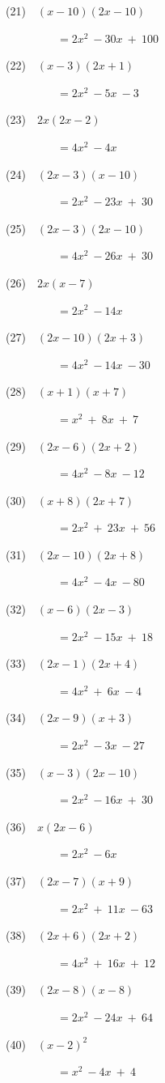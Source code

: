 \documentclass[a4j,twocolumn,10pt,fleqn]{jarticle}
\begin{document}
(21)~~$(x-10)(2x-10)$

~~~~~~~~~$=2x^2~-30x~+~100$

(22)~~$(x-3)(2x+1)$

~~~~~~~~~$=2x^2~-5x~-3$

(23)~~$2x(2x-2)$

~~~~~~~~~$=4x^2~-4x$

(24)~~$(2x-3)(x-10)$

~~~~~~~~~$=2x^2~-23x~+~30$

(25)~~$(2x-3)(2x-10)$

~~~~~~~~~$=4x^2~-26x~+~30$

(26)~~$2x(x-7)$

~~~~~~~~~$=2x^2~-14x$

(27)~~$(2x-10)(2x+3)$

~~~~~~~~~$=4x^2~-14x~-30$

(28)~~$(x+1)(x+7)$

~~~~~~~~~$=x^2~+~8x~+~7$

(29)~~$(2x-6)(2x+2)$

~~~~~~~~~$=4x^2~-8x~-12$

(30)~~$(x+8)(2x+7)$

~~~~~~~~~$=2x^2~+~23x~+~56$

(31)~~$(2x-10)(2x+8)$

~~~~~~~~~$=4x^2~-4x~-80$

(32)~~$(x-6)(2x-3)$

~~~~~~~~~$=2x^2~-15x~+~18$

(33)~~$(2x-1)(2x+4)$

~~~~~~~~~$=4x^2~+~6x~-4$

(34)~~$(2x-9)(x+3)$

~~~~~~~~~$=2x^2~-3x~-27$

(35)~~$(x-3)(2x-10)$

~~~~~~~~~$=2x^2~-16x~+~30$

(36)~~$x(2x-6)$

~~~~~~~~~$=2x^2~-6x$

(37)~~$(2x-7)(x+9)$

~~~~~~~~~$=2x^2~+~11x~-63$

(38)~~$(2x+6)(2x+2)$

~~~~~~~~~$=4x^2~+~16x~+~12$

(39)~~$(2x-8)(x-8)$

~~~~~~~~~$=2x^2~-24x~+~64$

(40)~~$(x-2)^2$

~~~~~~~~~$=x^2~-4x~+~4$
\end{document}
